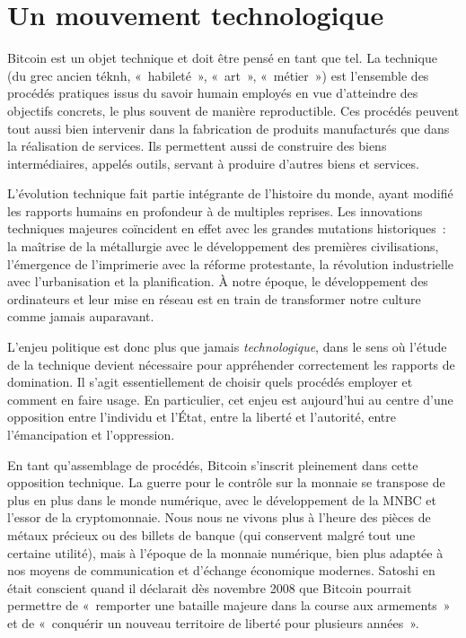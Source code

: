 
\chapter{Un mouvement technologique}
\label{ch:5}

Bitcoin est un objet technique et doit être pensé en tant que tel. La technique (du grec ancien \foreignlanguage{greek}{téknh}, «~habileté~», «~art~», «~métier~») est l'ensemble des procédés pratiques issus du savoir humain employés en vue d'atteindre des objectifs concrets, le plus souvent de manière reproductible. Ces procédés peuvent tout aussi bien intervenir dans la fabrication de produits manufacturés que dans la réalisation de services. Ils permettent aussi de construire des biens intermédiaires, appelés outils, servant à produire d'autres biens et services.

L'évolution technique fait partie intégrante de l'histoire du monde, ayant modifié les rapports humains en profondeur à de multiples reprises. Les innovations techniques majeures coïncident en effet avec les grandes mutations historiques~: la maîtrise de la métallurgie avec le développement des premières civilisations, l'émergence de l'imprimerie avec la réforme protestante, la révolution industrielle avec l'urbanisation et la planification. À notre époque, le développement des ordinateurs et leur mise en réseau est en train de transformer notre culture comme jamais auparavant.

L'enjeu politique est donc plus que jamais \emph{technologique}, dans le sens où l'étude de la technique devient nécessaire pour appréhender correctement les rapports de domination. Il s'agit essentiellement de choisir quels procédés employer et comment en faire usage.  En particulier, cet enjeu est aujourd'hui au centre d'une opposition entre l'individu et l'État, entre la liberté et l'autorité, entre l'émancipation et l'oppression.

En tant qu'assemblage de procédés, Bitcoin s'inscrit pleinement dans cette opposition technique. La guerre pour le contrôle sur la monnaie se transpose de plus en plus dans le monde numérique, avec le développement de la MNBC et l'essor de la cryptomonnaie. Nous nous ne vivons plus à l'heure des pièces de métaux précieux ou des billets de banque (qui conservent malgré tout une certaine utilité), mais à l'époque de la monnaie numérique, bien plus adaptée à nos moyens de communication et d'échange économique modernes. Satoshi en était conscient quand il déclarait dès novembre 2008 que Bitcoin pourrait permettre de «~remporter une bataille majeure dans la course aux armements~» et de «~conquérir un nouveau territoire de liberté pour plusieurs années~».

